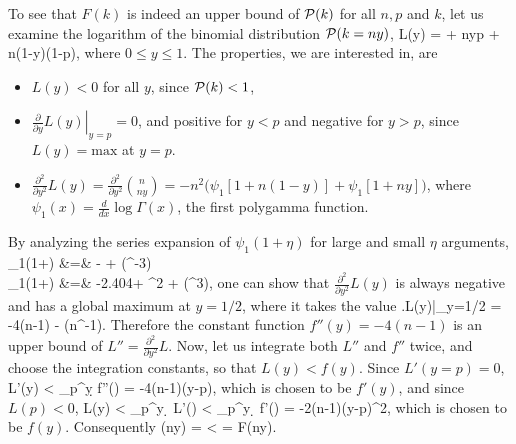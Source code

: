 To see that $F(k)$ is indeed an upper bound of $\mathcal{P}(k)$ for all $n,p$ and $k$,
let us examine the logarithm of the binomial distribution $\mathcal{P}(k=ny)$,
\bel
	L(y) =  + ny\log p + n(1-y)\log(1-p),
\eel
where $0\leq y \leq 1$. The properties, we are interested in, are
\begin{itemize}
  \item $L(y)< 0$ for all $y$, since $\mathcal{P}(k)<1$,
  \item $\left.\frac{\partial}{\partial y}L(y)\right|_{y=p} = 0$,  and positive
  for $y<p$ and negative for $y>p$, since $L(y)=\mathrm{max}$ at $y=p$.
  \item $\frac{\partial^2}{\partial y^2}L(y) = \frac{\partial^2}{\partial
  y^2}{ n \choose ny} = -n^2\Big(\psi_1[1+n(1-y)] + \psi_1[1+ny]\Big)$, where
  $\psi_1(x) = \frac{d}{dx}\log\Gamma(x)$, the first polygamma function.
\end{itemize}
By analyzing the series expansion of $\psi_1(1+\eta)$ for large and small $\eta$
arguments,
\bal
	\psi_1(1+\eta) &=&  -  +
	(\eta^{-3})\qquad \eta {}\\
	\psi_1(1+\eta) &=&  -2.404\eta + \eta^2 +
	(\eta^3)\qquad \eta {},
\eal
one can show that $\frac{\partial^2}{\partial y^2}L(y)$ is always
negative and has a global maximum at $y=1/2$, where it takes the value
\bel
	\left.L(y)\right|_{y=1/2} =
	-4(n-1) -
	(n^{-1}).
\eel
Therefore the constant function $f''(y) = -4(n-1)$ is an upper bound of $L'' =
\frac{\partial^2}{\partial y^2}L$. Now, let us integrate both
$L''$ and $f''$ twice, and choose the integration constants, so that $L(y) < f(y)$. Since $L'(y=p) = 0$,
\bel
	L'(y) < \intop_p^y\d{\zeta} f''(\zeta) =
	-4(n-1)(y-p),
\eel
which is chosen to be $f'(y)$, and since $L(p) < 0$,
\bel
	L(y) < \intop_p^y \d{\zeta} L'(\zeta) <
	\intop_p^y \d{\zeta} f'(\zeta) = -2(n-1)(y-p)^2,
\eel
which is chosen to be $f(y)$. 
Consequently
\bel
	\PP(ny) = \exp [L(y)]  < \exp [f(y)] = F(ny).
\eel


